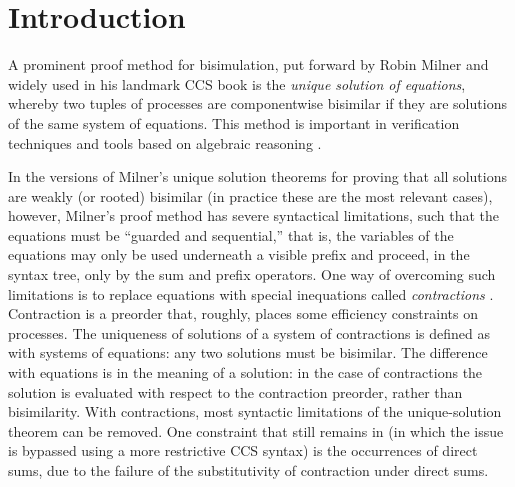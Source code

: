 \section{Introduction}

A prominent proof method for bisimulation, put forward by Robin Milner and widely used in his
landmark CCS book \cite{Mil89} is the
\emph{unique solution of equations}, whereby two tuples of processes are
componentwise bisimilar if they are solutions 
of the same system of equations.
This method is important in verification techniques and tools
based on algebraic reasoning \cite{BaeBOOK,theoryAndPractice,RosUnder10}. 

In the versions of Milner's unique solution theorems for proving that all
solutions are weakly (or rooted) bisimilar (in practice these are the most
relevant cases), however,
Milner's proof method has severe syntactical limitations, such that
the equations must be ``guarded and sequential,'' that is, the
variables of the equations may only be used underneath a visible
prefix and proceed, in the syntax tree, only by the sum and prefix operators.
One way of overcoming such limitations is to replace equations
 with special inequations called
\emph{contractions} \cite{sangiorgi2015equations,sangiorgi2017equations}. Contraction is a
preorder that, roughly, places some efficiency
constraints on processes.  The uniqueness of solutions of a system of contractions
is defined as with systems of equations: any two solutions must be bisimilar.
The difference with equations is in the meaning of a solution:
in the case of contractions the solution is evaluated with respect to
the contraction preorder, rather than bisimilarity. 
With contractions, most syntactic limitations of the unique-solution theorem can be
removed.  One constraint that still remains in
\cite{sangiorgi2017equations} (in which the issue is bypassed using a more
restrictive CCS syntax)
is the occurrences of direct sums, due to the failure of the
substitutivity of contraction under direct sums.

